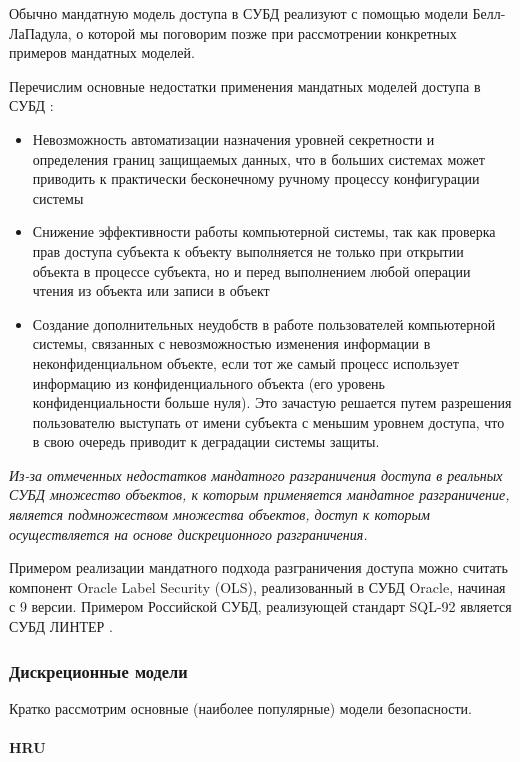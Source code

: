 Обычно мандатную модель доступа в СУБД реализуют с помощью модели Белл-ЛаПадула, о которой мы поговорим позже 
при рассмотрении конкретных примеров мандатных моделей.

Перечислим основные недостатки применения мандатных моделей доступа в СУБД \autocite{Skakun}:
\begin{itemize}
    \item Невозможность автоматизации назначения уровней секретности и определения границ защищаемых данных, 
    что в больших системах может приводить к практически бесконечному ручному процессу конфигурации системы
    \item Снижение эффективности работы компьютерной системы, так как проверка прав доступа субъекта к объекту 
    выполняется не только при открытии объекта в процессе субъекта, но и перед выполнением любой операции 
    чтения из объекта или записи в объект
    \item Создание дополнительных неудобств в работе пользователей компьютерной системы, связанных с 
    невозможностью изменения информации в неконфиденциальном объекте, если тот же самый процесс использует 
    информацию из конфиденциального объекта (его уровень конфиденциальности больше нуля). Это зачастую
    решается путем разрешения пользователю выступать от имени субъекта с меньшим уровнем доступа, что в 
    свою очередь приводит к деградации системы защиты.
\end{itemize}

\textit{Из-за отмеченных недостатков мандатного разграничения доступа в реальных СУБД множество объектов, к которым 
применяется мандатное разграничение, является подмножеством множества объектов, доступ к которым осуществляется 
на основе дискреционного разграничения.}

Примером реализации мандатного подхода разграничения доступа можно считать компонент Oracle Label Security (OLS), 
реализованный в СУБД Oracle, начиная с 9 версии. Примером Российской СУБД, реализующей стандарт SQL-92 является 
СУБД ЛИНТЕР \autocite{Skakun}.

\subsubsection{Дискреционные модели}

Кратко рассмотрим основные (наиболее популярные) модели безопасности.

\paragraph{HRU}
